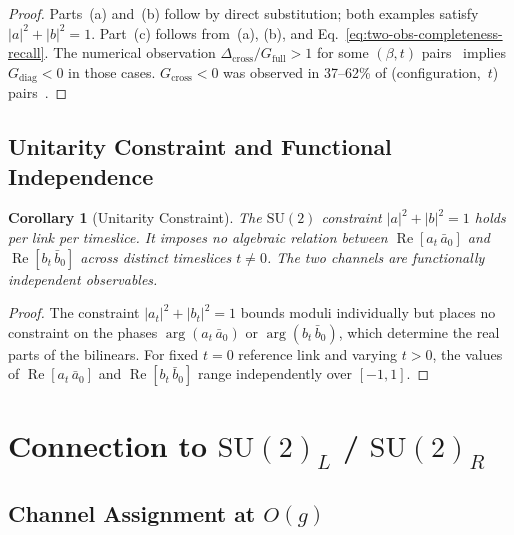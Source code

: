 \documentclass[12pt]{article}
\numberwithin{equation}{section}
\theoremstyle{plain}
\newtheorem{corollary}{Corollary}[section]
\theoremstyle{definition}
\theoremstyle{remark}
\newcommand{\su}{\mathrm{SU}}              %
\newcommand{\Gdiag}{G_{\mathrm{diag}}}     %
\newcommand{\Gcross}{G_{\mathrm{cross}}}   %
\newcommand{\Gfull}{G_{\mathrm{full}}}     %
\newcommand{\Dcross}{\Delta_{\mathrm{cross}}}  %
\begin{document}
	\begin{proof}
		Parts~(a) and~(b) follow by direct substitution; both examples
		satisfy $|a|^{2}+|b|^{2}=1$.  Part~(c) follows from~(a), (b), and
		Eq.~\eqref{eq:two-obs-completeness-recall}.  The numerical
		observation $\Dcross/\Gfull > 1$ for some $(\beta,t)$
		pairs~\cite{FirestoneP4} implies $\Gdiag < 0$ in those cases.
		$\Gcross < 0$ was observed in 37--62\% of (configuration,~$t$)
		pairs~\cite{FirestoneP4}.
	\end{proof}
	
	\subsection{Unitarity Constraint and Functional Independence}
	\label{sec:cor-unitarity}
	
	\begin{corollary}[Unitarity Constraint]
		\label{cor:unitarity}
		The $\su(2)$ constraint $|a|^{2}+|b|^{2}=1$ holds per link per
		timeslice.  It imposes no algebraic relation between
		$\operatorname{Re}[a_t\,\bar{a}_0]$ and
		$\operatorname{Re}[b_t\,\bar{b}_0]$ across distinct timeslices
		$t \neq 0$.  The two channels are functionally independent
		observables.
	\end{corollary}
	
	\begin{proof}
		The constraint $|a_t|^{2}+|b_t|^{2}=1$ bounds moduli individually
		but places no constraint on the phases $\arg(a_t\,\bar{a}_0)$ or
		$\arg(b_t\,\bar{b}_0)$, which determine the real parts of the
		bilinears.  For fixed $t=0$ reference link and varying $t > 0$,
		the values of $\operatorname{Re}[a_t\,\bar{a}_0]$ and
		$\operatorname{Re}[b_t\,\bar{b}_0]$ range independently over
		$[-1,1]$.
	\end{proof}
	
	\section{Connection to \texorpdfstring{$\su(2)_L$}{SU(2)\_L} /
		\texorpdfstring{$\su(2)_R$}{SU(2)\_R}}
	\label{sec:SU2-LR}
	
	\subsection{Channel Assignment at \texorpdfstring{$O(g)$}{O(g)}}
	\label{sec:channel-assign}
	
\end{document}
